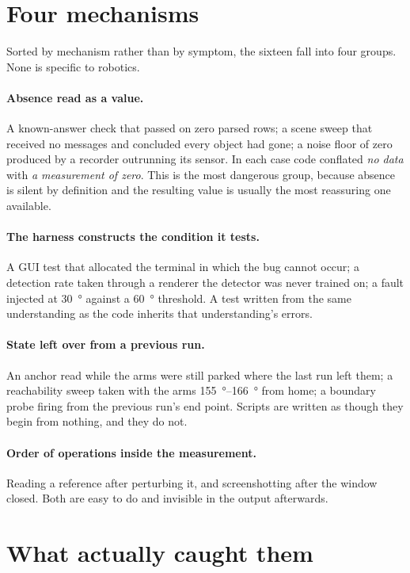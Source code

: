 \section{Four mechanisms}

Sorted by mechanism rather than by symptom, the sixteen fall into four groups.
None is specific to robotics.

\paragraph{Absence read as a value.} A known-answer check that passed on zero
parsed rows; a scene sweep that received no messages and concluded every
object had gone; a noise floor of zero produced by a recorder outrunning its
sensor. In each case code conflated \emph{no data} with \emph{a measurement of
zero}. This is the most dangerous group, because absence is silent by
definition and the resulting value is usually the most reassuring one
available.

\paragraph{The harness constructs the condition it tests.} A GUI test that
allocated the terminal in which the bug cannot occur; a detection rate taken
through a renderer the detector was never trained on; a fault injected at
\SI{30}{\degree} against a \SI{60}{\degree} threshold. A test written from the
same understanding as the code inherits that understanding's errors.

\paragraph{State left over from a previous run.} An anchor read while the arms
were still parked where the last run left them; a reachability sweep taken
with the arms \SIrange{155}{166}{\degree} from home; a boundary probe firing
from the previous run's end point. Scripts are written as though they begin
from nothing, and they do not.

\paragraph{Order of operations inside the measurement.} Reading a reference
after perturbing it, and screenshotting after the window closed. Both are easy
to do and invisible in the output afterwards.

\section{What actually caught them}

